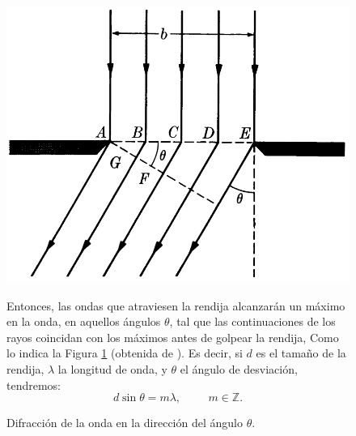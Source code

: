 \documentclass[12pt,a4paper]{article}
\begin{document}
\begin{figure}[hbt!]
	\begin{minipage}{0.4\linewidth}
	\centering
	\includegraphics[width= \linewidth]{1_INTRO/seno.png}
	\caption{Difracción de la onda en la dirección del ángulo \(\theta\).}
	\label{fig:seno}
	\end{minipage}\hspace{5mm}
	\begin{minipage}{0.6\linewidth}
		Entonces, las ondas que atraviesen la rendija alcanzarán un máximo en la onda, en aquellos ángulos \(\theta\), tal que las continuaciones de los rayos coincidan con los máximos antes de golpear la rendija, Como lo indica la Figura \ref{fig:seno} (obtenida de ).
		Es decir, si \(d\) es el tamaño de la rendija, \(\lambda\) la longitud de onda, y \(\theta\) el ángulo de desviación, tendremos:
		\begin{equation}
			d \sin \theta = m \lambda , \hspace{1cm} m \in \mathds{Z}.
			\label{eq:posicion_angular}
		\end{equation}
	\end{minipage}
\end{figure}
\end{document}
